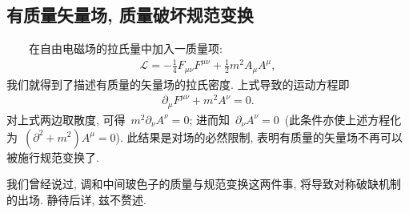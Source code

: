 \subsection{有质量矢量场, 质量破坏规范变换}



~~~~在自由电磁场的拉氏量中加入一质量项:
\begin{align}
\mathcal{L}=-\frac{1}{4}F_{\mu\nu}F^{\mu\nu}+\frac{1}{2}m^2A_\mu A^\mu,
\end{align}
我们就得到了描述有质量的矢量场的拉氏密度. 上式导致的运动方程即
\begin{align}
\partial_\mu F^{\mu\nu}+m^2A^\nu=0.
\end{align}
对上式两边取散度, 可得~$m^2\partial_\nu A^\nu=0$; 进而知~$\partial_\nu A^\nu=0$~(此条件亦使上述方程化为~$(\partial^2+m^2)A^\mu=0$). 此结果是对场的必然限制, 表明有质量的矢量场不再可以被施行规范变换了.

我们曾经说过, 调和中间玻色子的质量与规范变换这两件事, 将导致对称破缺机制的出场. 静待后详, 兹不赘述.




